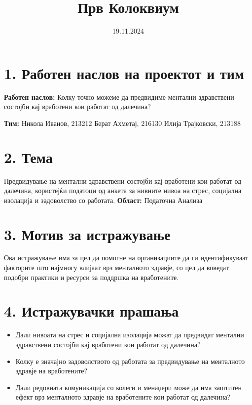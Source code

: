 \documentclass[12pt]{article}
\title{Прв Колоквиум }
\date{19.11.2024}
\begin{document}
\maketitle

\section*{1. Работен наслов на проектот и тим}
\textbf{Работен наслов:}  
Колку точно можеме да предвидиме ментални здравствени состојби кај вработени кои работат од далечина?  

\textbf{Тим:} \newline
Никола Иванов, 213212 \newline
Берат Ахметај, 216130 \newline
Илија Трајковски, 213188


\section*{2. Тема}
Предвидување на ментални здравствени состојби кај вработени кои работат од далечина, користејќи податоци од анкета за нивните нивоа на стрес, социјална изолација и задоволство со работата. \newline
\textbf{Област:} Податочна Анализа

\section*{3. Мотив за истражување}
Ова истражување има за цел да помогне на организациите да ги идентификуваат факторите што најмногу влијаат врз менталното здравје, со цел да воведат подобри практики и ресурси за поддршка на вработените.  

\section*{4. Истражувачки прашања}
\begin{itemize}
    \item Дали нивоата на стрес и социјална изолација можат да предвидат ментални здравствени состојби кај вработени кои работат од далечина?
    \item Колку е значајно задоволството од работата за предвидување на менталното здравје на вработените?
    \item Дали редовната комуникација со колеги и менаџери може да има заштитен ефект врз менталното здравје на вработените кои работат од далечина?
\end{itemize}
\end{document}
